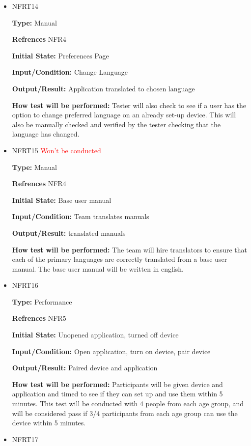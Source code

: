 \documentclass[12pt, titlepage]{article}
\begin{document}
\begin{itemize}
\item{NFRT14}

\textbf{Type:} Manual

\textbf{Refrences} NFR4
					
\textbf{Initial State:} Preferences Page
					
\textbf{Input/Condition:} Change Language
					
\textbf{Output/Result:} Application translated to chosen language
					
\textbf{How test will be performed:} Tester will also check to see if a user has the option to change preferred language on an already set-up device. This will also be manually checked and verified by the tester checking that the language has changed.

\item{NFRT15} \textcolor{red}{Won't be conducted}

\textbf{Type:} Manual

\textbf{Refrences} NFR4
					
\textbf{Initial State:} Base user manual  
					
\textbf{Input/Condition:} Team translates manuals
					
\textbf{Output/Result:} translated manuals
					
\textbf{How test will be performed:} The team will hire translators to ensure that each of the primary languages are correctly translated from a base user manual. The base user manual will be written in english.

\item{NFRT16}

\textbf{Type:} Performance

\textbf{Refrences} NFR5
					
\textbf{Initial State:} Unopened application, turned off device
					
\textbf{Input/Condition:} Open application, turn on device, pair device
					
\textbf{Output/Result:} Paired device and application
					
\textbf{How test will be performed:} Participants will be given device and application and timed to see if they can set up and use them within 5 minutes. This test will be conducted with 4 people from each age group, and will be considered pass if 3/4 participants from each age group can use the device within 5 minutes.

\item{NFRT17}


\end{itemize}
\end{document}

